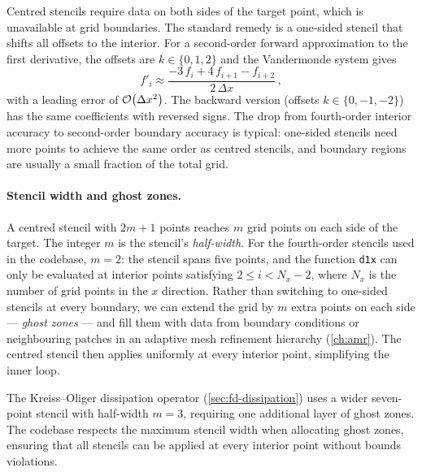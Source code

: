 Centred stencils require data on both sides of the target point, which is
unavailable at grid boundaries.  The standard remedy is a one-sided stencil
that shifts all offsets to the interior.  For a second-order forward
approximation to the first derivative, the offsets are $k \in \{0, 1, 2\}$
and the Vandermonde system gives
%
\begin{equation}
  f'_i \approx \frac{-3\,f_i + 4\,f_{i+1} - f_{i+2}}{2\,\Delta x} \,,
  \label{eq:d1-onesided}
\end{equation}
%
with a leading error of $\mathcal{O}\!\left(\Delta x^2\right)$.  The backward version
(offsets $k \in \{0, -1, -2\}$) has the same coefficients with reversed
signs.  The drop from fourth-order interior accuracy to second-order boundary
accuracy is typical: one-sided stencils need more points to achieve the same
order as centred stencils, and boundary regions are usually a small fraction
of the total grid.

\paragraph{Stencil width and ghost zones.}

A centred stencil with $2m + 1$ points reaches $m$ grid points on each side
of the target.  The integer $m$ is the stencil's \emph{half-width}.  For the
fourth-order stencils used in the codebase, $m = 2$: the stencil spans five
points, and the function \texttt{d1x} can only be evaluated at interior points
satisfying $2 \leq i < N_x - 2$, where $N_x$ is the number of grid points in
the $x$ direction.  Rather than switching to one-sided stencils at every
boundary, we can extend the grid by $m$ extra points on each side ---
\emph{ghost zones} --- and fill them with data from boundary conditions or
neighbouring patches in an adaptive mesh refinement hierarchy
(\cref{ch:amr}).  The centred stencil then applies uniformly at every
interior point, simplifying the inner loop.

The Kreiss--Oliger dissipation operator (\cref{sec:fd-dissipation}) uses a
wider seven-point stencil with half-width $m = 3$, requiring one additional
layer of ghost zones.  The codebase respects the maximum stencil width when
allocating ghost zones, ensuring that all stencils can be applied at every
interior point without bounds violations.
